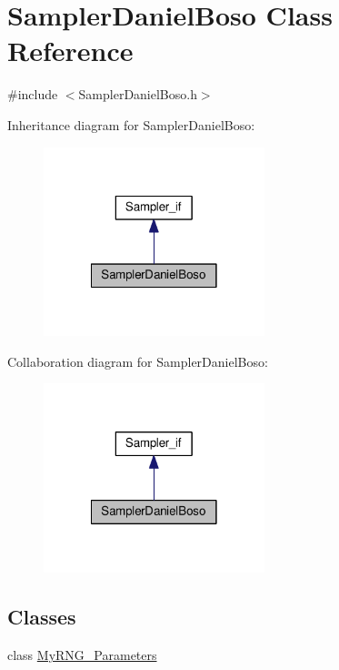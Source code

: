\hypertarget{class_sampler_daniel_boso}{\section{Sampler\-Daniel\-Boso Class Reference}
\label{class_sampler_daniel_boso}
}


{\ttfamily \#include $<$Sampler\-Daniel\-Boso.\-h$>$}



Inheritance diagram for Sampler\-Daniel\-Boso\-:
\nopagebreak
\begin{figure}[H]
\begin{center}
\leavevmode
\includegraphics[width=182pt]{class_sampler_daniel_boso__inherit__graph}
\end{center}
\end{figure}


Collaboration diagram for Sampler\-Daniel\-Boso\-:
\nopagebreak
\begin{figure}[H]
\begin{center}
\leavevmode
\includegraphics[width=182pt]{class_sampler_daniel_boso__coll__graph}
\end{center}
\end{figure}
\subsection*{Classes}
\begin{DoxyCompactItemize}
\item 
class \hyperlink{class_sampler_daniel_boso_1_1_my_r_n_g___parameters}{My\-R\-N\-G\-\_\-\-Parameters}
\end{DoxyCompactItemize}
